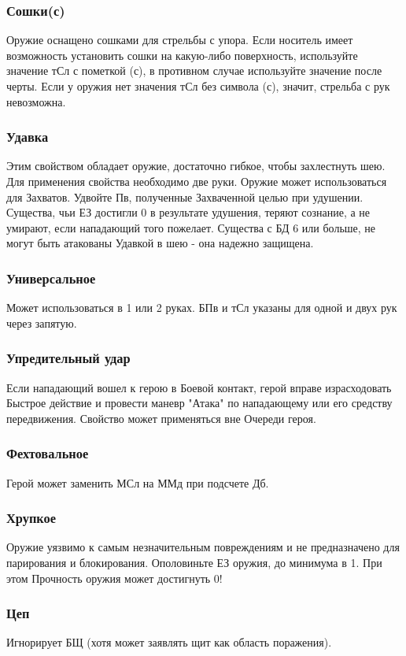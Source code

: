 \subsubsection{Сошки(с)} Оружие оснащено сошками для стрельбы с упора. Если носитель имеет возможность установить сошки на какую-либо поверхность, используйте значение тСл с пометкой (с), в противном случае используйте значение после черты. Если у оружия нет значения тСл без символа (с), значит, стрельба с рук невозможна.
\subsubsection{Удавка} Этим свойством обладает оружие, достаточно гибкое, чтобы захлестнуть шею. 
\newline Для применения свойства необходимо две руки. Оружие может использоваться для Захватов. Удвойте Пв, полученные Захваченной целью при удушении. Существа, чьи ЕЗ достигли 0 в результате удушения, теряют сознание, а не умирают, если нападающий того пожелает. 
\newline Существа с БД 6 или больше, не могут быть атакованы Удавкой в шею - она надежно защищена.
\subsubsection{Универсальное} Может использоваться в 1 или 2 руках. БПв и тСл указаны для одной и двух рук через запятую.
\subsubsection{Упредительный удар} Если нападающий вошел к герою в Боевой контакт, герой вправе израсходовать Быстрое действие и провести маневр "Атака" по нападающему или его средству передвижения. Свойство может применяться вне Очереди героя.
\subsubsection{Фехтовальное} Герой может заменить МСл на ММд при подсчете Дб.
\subsubsection{Хрупкое} Оружие уязвимо к самым незначительным повреждениям и не предназначено для парирования и блокирования. Ополовиньте ЕЗ оружия, до минимума в 1. При этом Прочность оружия может достигнуть 0!
\subsubsection{Цеп} Игнорирует БЩ (хотя может заявлять щит как область поражения). 

